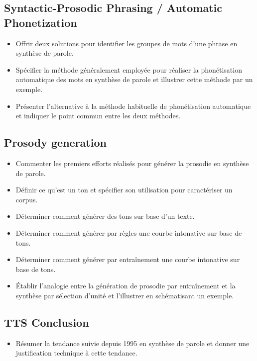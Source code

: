 \documentclass[letterpaper, 12pt]{article}
\begin{document}
	\subsection{Syntactic-Prosodic Phrasing / Automatic Phonetization}
		\begin{itemize}
			\setlength{\itemsep}{0pt}		
			\setlength{\parskip}{0pt}		
			\setlength{\parsep}{0pt}	
			\item Offrir deux solutions pour identifier les groupes de mots d'une phrase en synthèse de parole.
		    \item Spécifier la méthode généralement employée pour réaliser la phonétisation automatique des 
		    	mots en synthèse de parole et illustrer cette méthode par un exemple.
		    \item Présenter l'alternative à la méthode habituelle de phonétisation automatique et indiquer le point 
		    	commun entre les deux méthodes.
		\end{itemize}
	\subsection{Prosody generation}
		\begin{itemize}
			\setlength{\itemsep}{0pt}		
			\setlength{\parskip}{0pt}		
			\setlength{\parsep}{0pt}	
		    \item Commenter les premiers efforts réalisés pour générer la prosodie en synthèse de parole.
		    \item Définir ce qu'est un ton et spécifier son utilisation pour caractériser un corpus.
		    \item Déterminer comment générer des tons sur base d'un texte.
		    \item Déterminer comment générer par règles une courbe intonative sur base de tons.
		    \item Déterminer comment générer par entraînement une courbe intonative sur base de tons.
		    \item Établir l'analogie entre la génération de prosodie par entraînement et la synthèse par 
		    	sélection d'unité et l'illustrer en schématisant un exemple.
		\end{itemize}
	\subsection{TTS Conclusion}
		\begin{itemize}
			\setlength{\itemsep}{0pt}		
			\setlength{\parskip}{0pt}		
			\setlength{\parsep}{0pt}	
			\item Résumer la tendance suivie depuis 1995 en synthèse de parole et donner une justification 
				technique à cette tendance.
		\end{itemize}
\end{document}
